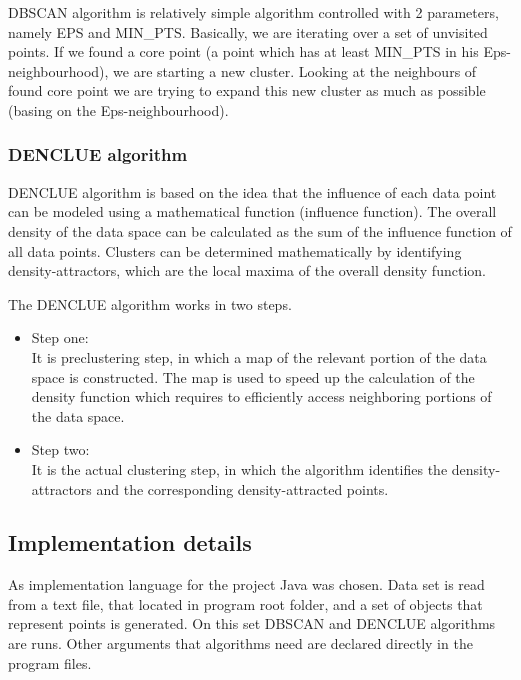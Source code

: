 \documentclass[12pt, a4paper, notitlepage, oneside]{article}
\begin{document}
DBSCAN algorithm is relatively simple algorithm controlled with 2 parameters, namely EPS and MIN\_PTS. \cite{dbscan}
Basically, we are iterating over a set of unvisited points. If we found a core point (a point which has
at least MIN\_PTS in his Eps-neighbourhood), we are starting a new cluster. Looking at the neighbours 
of found core point we are trying to expand this new cluster as much as possible (basing on the Eps-neighbourhood).



\subsubsection*{DENCLUE algorithm}

DENCLUE algorithm is based on the idea that the influence of each data point can be modeled using a mathematical function (influence function). The overall density of the data space can be calculated as the sum of the influence function of all data points. Clusters can be determined mathematically by identifying density-attractors, which are the local maxima of the overall density function.

The DENCLUE algorithm works in two steps. 



\begin{itemize}
	\item Step one: \\It is preclustering step, in which a map of the relevant portion of the data space is constructed. The map is used to speed up the calculation of the density function which requires to efficiently access neighboring portions of the data space. 
\end{itemize}



\begin{itemize}
	\item Step two: \\It is the actual clustering step, in which the algorithm identifies the density-attractors and the corresponding density-attracted points.
\end{itemize}

\subsection*{Implementation details}

As implementation language for the project Java was chosen. Data set is read from a text file, that located in program root folder, and a set of objects that represent points is generated. On this set DBSCAN and DENCLUE algorithms are runs. Other arguments that algorithms need are declared directly in the program files.
\end{document}

